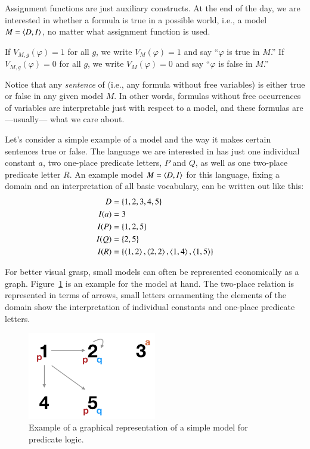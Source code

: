 \documentclass[nobib,nofonts]{tufte-handout}
\newcommand{\predlog}{\acro{PredLog}}
\begin{document}
Assignment functions are just auxiliary constructs.
At the end of the day, we are interested in whether a formula is true in a possible world, i.e., a model $M = \left \langle D,I\right\rangle$, no matter what assignment function is used.

If $V_{M,g}(\varphi) = 1$ for all $g$, we write $V_{M}(\varphi) = 1$ and say ``$\varphi$ is true in $M$.''
If $V_{M,g}(\varphi) = 0$ for all $g$, we write $V_{M}(\varphi) = 0$ and say ``$\varphi$ is false in $M$.''

Notice that any \emph{sentence} of \predlog (i.e., any formula without free variables) is either true or false in any given model $M$.
In other words, formulas without free occurrences of variables are interpretable just with respect to a model, and these formulas are ---usually--- what we care about.

Let's consider a simple example of a model and the way it makes certain sentences true or false.
The language we are interested in has just one individual constant $a$, two one-place predicate letters, $P$ and $Q$, as well as one two-place predicate letter $R$.
An example model $M = \left \langle D, I\right\rangle$ for this language, fixing a domain and an interpretation of all basic vocabulary, can be written out like this:
\begin{align*}
  D    & = \left\{1,2,3,4,5\right\}\\
  I(a) & = 3 \\
  I(P) & = \left\{1,2,5\right\} \\
  I(Q) & = \left\{2,5\right\} \\
  I(R) & = \left\{\left \langle 1,2\right\rangle,\left \langle 2,2\right\rangle, \left \langle 1,4\right\rangle, \left \langle 1,5\right\rangle\right\}
\end{align*}

For better visual grasp, small models can often be represented economically as a graph.
Figure~\ref{fig:predlog-exmple-model} is an example for the model at hand.
The two-place relation is represented in terms of arrows, small letters ornamenting the elements of the domain show the interpretation of individual constants and one-place predicate letters.

\begin{figure}
  \centering
  \includegraphics[width=0.5\textwidth]{00-pics/predlog-example-model.png}
  \caption{Example of a graphical representation of a simple model for predicate logic.}
  \label{fig:predlog-exmple-model}
\end{figure}
\end{document}

